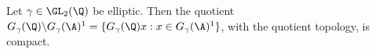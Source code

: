 Let $\gamma\in\GL_2(\Q)$ be elliptic. Then the quotient $G_\gamma(\Q)\backslash G_\gamma(\A)^1=\{G_\gamma(\Q)x:x\in G_\gamma(\A)^1\}$,
with the quotient topology, is compact.
